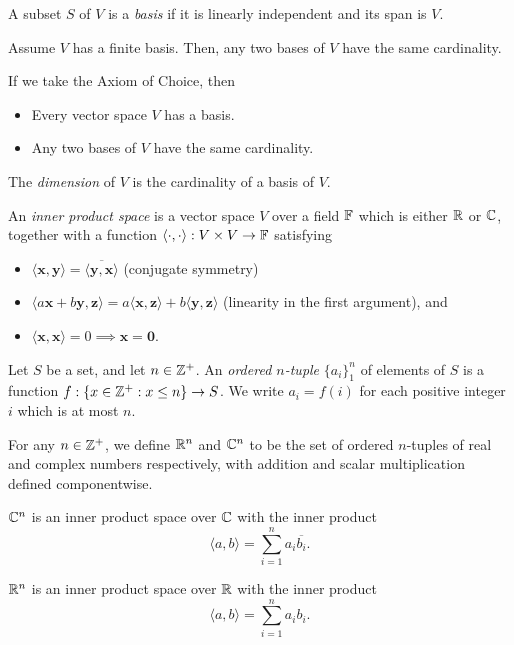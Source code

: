 \begin{defn}
  A subset $S$ of $V$ is a \emph{basis} if it is linearly independent and its
  span is $V$.
\end{defn}
\begin{thm}
  Assume $V$ has a finite basis. Then, any two bases of $V$ have the same
  cardinality.
\end{thm}
\begin{thm}
  If we take the Axiom of Choice, then
  \begin{itemize}
    \item Every vector space $V$ has a basis.
    \item Any two bases of $V$ have the same cardinality.
  \end{itemize}
\end{thm}
\begin{defn}
  The \emph{dimension} of $V$ is the cardinality of a basis of $V$.
\end{defn}
\begin{defn}
  An \emph{inner product space} is a vector space $V$ over a field $\mathbb{F}$ which
  is either $\mathbb{R}$ or $\mathbb{C}$, together with a function
  $\langle\cdot,\cdot\rangle:V\times V\to\mathbb{F}$ satisfying
  \begin{itemize}
    \item $\langle \mathbf x,\mathbf y\rangle=\overline{\langle \mathbf
      y,\mathbf x\rangle}$ (conjugate
      symmetry)
    \item $\langle a\mathbf x+b\mathbf y,\mathbf z\rangle=a\langle\mathbf
      x,\mathbf z\rangle+b\langle\mathbf y,\mathbf z\rangle$ (linearity in the
      first argument), and
    \item $\langle\mathbf x,\mathbf x\rangle=0\implies\mathbf x=\mathbf 0$.
  \end{itemize}
\end{defn}
\begin{defn}
  Let $S$ be a set, and let $n\in\mathbb{Z}^+$. An \emph{ordered $n$-tuple} 
  $\{a_i\}_1^n$
  of elements of $S$ is a function $f:\{x\in\mathbb{Z}^+:x\le n\}\to S$. We write
  $a_i=f(i)$ for each positive integer $i$ which is at most $n$.
\end{defn}
\begin{defn}
  For any $n\in\mathbb{Z}^+$, we define $\mathbb{R}^n$ and $\mathbb{C}^n$ to be the set of ordered
  $n$-tuples of real and complex numbers respectively, with addition and
  scalar multiplication defined componentwise.
\end{defn}
\begin{prop}
  $\mathbb{C}^n$ is an inner product space over $\mathbb{C}$ with the inner product
  \[\langle a,b\rangle=\sum_{i=1}^n a_i\overline{b_i}.\] 

  $\mathbb{R}^n$ is an inner product space over $\mathbb{R}$ with the inner product
  \[\langle a,b\rangle=\sum_{i=1}^n a_i b_i.\]
\end{prop}
